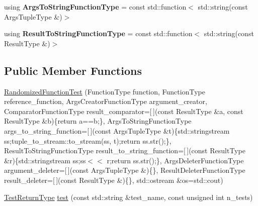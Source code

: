\begin{DoxyCompactItemize}
\item 
using {\bfseries Args\+To\+String\+Function\+Type} = const std\+::function$<$ std\+::string(const Args\+Tuple\+Type \&)$>$\hypertarget{classunittest_1_1_randomized_function_test_a2859de28c0aa157fe363094033618641}{}\label{classunittest_1_1_randomized_function_test_a2859de28c0aa157fe363094033618641}

\item 
using {\bfseries Result\+To\+String\+Function\+Type} = const std\+::function$<$ std\+::string(const Result\+Type \&)$>$\hypertarget{classunittest_1_1_randomized_function_test_adba388ad83cce9bef714dce11eae7e37}{}\label{classunittest_1_1_randomized_function_test_adba388ad83cce9bef714dce11eae7e37}

\end{DoxyCompactItemize}
\subsection*{Public Member Functions}
\begin{DoxyCompactItemize}
\item 
\hyperlink{classunittest_1_1_randomized_function_test_a4f908f1ed468b9d25fd622d6d1b1794c}{Randomized\+Function\+Test} (Function\+Type function, Function\+Type reference\+\_\+function, Args\+Creator\+Function\+Type argument\+\_\+creator, Comparator\+Function\+Type result\+\_\+comparator=\mbox{[}$\,$\mbox{]}(const Result\+Type \&a, const Result\+Type \&b)\{return a==b;\}, Args\+To\+String\+Function\+Type args\+\_\+to\+\_\+string\+\_\+function=\mbox{[}$\,$\mbox{]}(const Args\+Tuple\+Type \&t)\{std\+::stringstream ss;tuple\+\_\+to\+\_\+stream\+::to\+\_\+stream(ss, t);return ss.\+str();\}, Result\+To\+String\+Function\+Type result\+\_\+to\+\_\+string\+\_\+function=\mbox{[}$\,$\mbox{]}(const Result\+Type \&r)\{std\+::stringstream ss;ss$<$$<$ r;return ss.\+str();\}, Args\+Deleter\+Function\+Type argument\+\_\+deleter=\mbox{[}$\,$\mbox{]}(const Args\+Tuple\+Type \&)\{\}, Result\+Deleter\+Function\+Type result\+\_\+deleter=\mbox{[}$\,$\mbox{]}(const Result\+Type \&)\{\}, std\+::ostream \&os=std\+::cout)
\item 
\hyperlink{structunittest_1_1_randomized_function_test_1_1_test_return_type}{Test\+Return\+Type} \hyperlink{classunittest_1_1_randomized_function_test_a7e4f4b28b4487e4cdd445faf4f4b0ca5}{test} (const std\+::string \&test\+\_\+name, const unsigned int n\+\_\+tests)
\end{DoxyCompactItemize}
